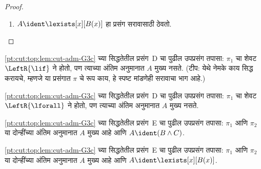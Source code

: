 \begin{proof}
\begin{enumerate}
सिद्धता~$\pi_1'$ ची
अंतिम क्रमवर्ती
$\Gamma \Sequent \Delta, B(c)$
आहे, जेथे $c$ हा
$\RightR{\lforall}$ अनुमानाचा
आयगेन चर आहे. म्हणून $c$ हे
$B(x)$, $\Gamma$ किंवा~$\Delta$
यांत येत नाही. सिद्धता~$\pi$
नियमित आहे असे मानू; त्यामुळे
$c$ हा फक्त पुढील
$\RightR{\lforall}$ अनुमानाचा
आयगेन चर आहे आणि फक्त त्याच्या
वर येतो. म्हणजे तो फक्त~$\pi_1'$
मध्ये येतो आणि $\pi_1'$ मधील
कोणत्याही अनुमानाचा आयगेन चर
नसतो. $c$ हे $\pi_2$ मध्ये
येत नसल्यामुळे $t$ मध्येही
येत नाही.
\ref{pt:seq:qua:lem:subst-regular}
नुसार सिद्धता~$\Subst{\pi_1'}{t}{c}$
ही $\Gamma \Sequent \Delta, B(t)$
ची सिद्धता आहे. आता पुढील
सिद्धता ला विगमन गृहीतक लावू:
\[
\AxiomC{}
\RightLabel{$\Subst{\pi_1'}{t}{c}$}
\Deduce$\Gamma \fCenter \Delta, B(t)$
\AxiomC{}
\RightLabel{$\pi_2''$}
\Deduce$B(t), \Gamma \fCenter \Delta$
\RightLabel{\CutCS}
\BinaryInf$\Gamma \fCenter \Delta$
\DisplayProof
\]
(कटचे सूत्र~$B(t)$
असल्यामुळे विगमन गृहीतक
लागू होते; या सिद्धता ची
कट-कोटी $\pi$ पेक्षा कमी आहे.)
\item $A \ident \lexists[x][B(x)]$
हा प्रसंग सरावासाठी ठेवतो.
\end{enumerate}
\end{proof}

\begin{prob}
\ref{pt:cut:top:lem:cut-adm-G3c} च्या
सिद्धतेतील प्रसंग~D चा
पुढील उपप्रसंग तपासा:
$\pi_1$ चा शेवट
$\LeftR{\lif}$ ने होतो,
पण त्याच्या अंतिम अनुमानात
$A$ मुख्य नसते.
(टीप: येथे नेमके काय सिद्ध
करायचे, म्हणजे या प्रसंगात
$\pi$ चे रूप काय, हे स्पष्ट
मांडणेही सरावाचा भाग आहे.)
\end{prob}

\begin{prob}
\ref{pt:cut:top:lem:cut-adm-G3c} च्या
सिद्धतेतील प्रसंग~D चा
पुढील उपप्रसंग तपासा:
$\pi_1$ चा शेवट
$\LeftR{\lforall}$ ने होतो,
पण त्याच्या अंतिम अनुमानात
$A$ मुख्य नसते.
\end{prob}

\begin{prob}
\ref{pt:cut:top:lem:cut-adm-G3c} च्या
सिद्धतेतील प्रसंग~E चा
पुढील उपप्रसंग तपासा:
$\pi_1$ आणि $\pi_2$
या दोन्हींच्या अंतिम अनुमानात
$A$ मुख्य आहे आणि
$A \ident (B \land C)$.
\end{prob}

\begin{prob}
\ref{pt:cut:top:lem:cut-adm-G3c} च्या
सिद्धतेतील प्रसंग~E चा
पुढील उपप्रसंग तपासा:
$\pi_1$ आणि $\pi_2$
या दोन्हींच्या अंतिम अनुमानात
$A$ मुख्य आहे आणि
$A \ident \lexists[x][B(x)]$.
\end{prob}

